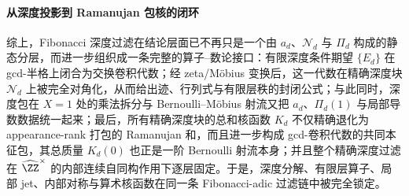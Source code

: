 \paragraph{从深度投影到 Ramanujan 包核的闭环}
综上，Fibonacci 深度过滤在结论层面已不再只是一个由 \(a_d\)、\(\mathcal N_d\) 与 \(\Pi_d\) 构成的静态分层，而进一步组织成一条完整的算子--数论接口：有限深度条件期望 \(\{E_d\}\) 在 gcd-半格上闭合为交换卷积代数；经 zeta/Möbius 变换后，这一代数在精确深度块 \(\mathcal N_d\) 上被完全对角化，从而给出迹、行列式与有限层秩的封闭公式；与此同时，深度包在 \(X=1\) 处的乘法拆分与 Bernoulli--Möbius 射流又把 \(a_d\)、\(\Pi_d(1)\) 与局部导数数据统一起来；最后，所有精确深度块的总和核函数 \(K_d\) 不仅精确退化为 appearance-rank 打包的 Ramanujan 和，而且进一步构成 gcd-卷积代数的共同本征包，其总质量 \(K_d(0)\) 也正是一阶 Bernoulli 射流本身；并且整个精确深度过滤在 \(\widehat{\ZZ}^{\times}\) 的内部连续自同构作用下逐层固定。于是，深度分解、有限层算子、局部 jet、内部对称与算术核函数在同一条 Fibonacci-adic 过滤链中被完全锁定。

\endinput

